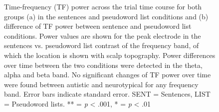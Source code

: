 \begin{figure}[!ht]
    \vspace{10pt}
	\centering
	\caption{Time-frequency (TF) power across the trial time course for both groups (a) in the sentences and pseudoword list conditions and (b) difference of TF power between sentence and pseudoword list conditions. Power values are shown for the peak electrode in the sentences vs. pseudoword list contrast of the frequency band, of which the location is shown with scalp topography. Power differences over time between the two conditions were detected in the theta, alpha and beta band. No significant changes of TF power over time were found between autistic and neurotypical for any frequency band. Error bars indicate standard error. SENT = Sentences, LIST = Pseudoword lists. ** = \textit{p} < .001, * = \textit{p} < .01}
    \vspace*{-10pt}
	\label{fig:tf-dynamics-peak}
\end{figure}


